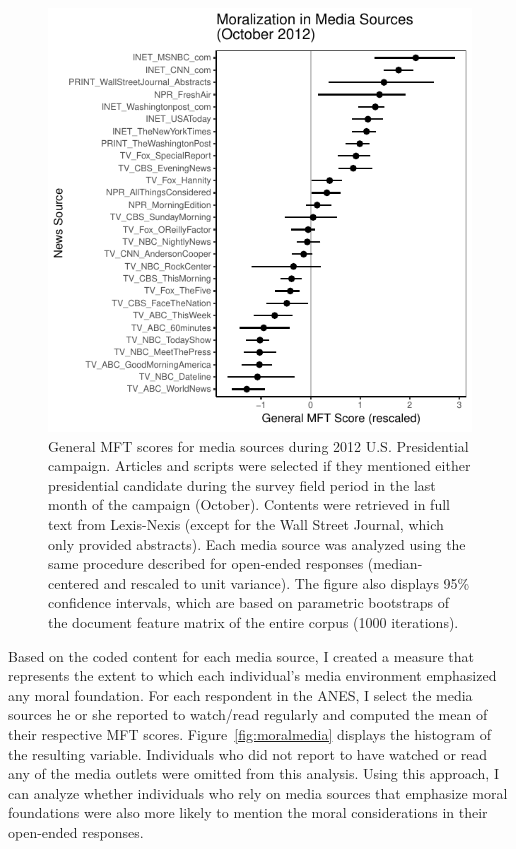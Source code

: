 \documentclass[12pt]{article}
\begin{document}
\begin{figure}[ht]\centering
\includegraphics{../calc/fig/media_desc.pdf}
\caption{General MFT scores for media sources during 2012 U.S. Presidential campaign. Articles and scripts were selected if they mentioned either presidential candidate during the survey field period in the last month of the campaign (October). Contents were retrieved in full text from Lexis-Nexis (except for the Wall Street Journal, which only provided abstracts). Each media source was analyzed using the same procedure described for open-ended responses (median-centered and rescaled to unit variance). The figure also displays 95\% confidence intervals, which are based on parametric bootstraps of the document feature matrix of the entire corpus (1000 iterations).}\label{fig:media_desc}
\end{figure}


Based on the coded content for each media source, I created a measure that represents the extent to which each individual's media environment emphasized any moral foundation. For each respondent in the ANES, I select the media sources he or she reported to watch/read regularly and computed the mean of their respective MFT scores. Figure~\ref{fig:moralmedia} displays the histogram of the resulting variable. Individuals who did not report to have watched or read any of the media outlets were omitted from this analysis. Using this approach, I can analyze whether individuals who rely on media sources that emphasize moral foundations were also more likely to mention the moral considerations in their open-ended responses. 
\end{document}
